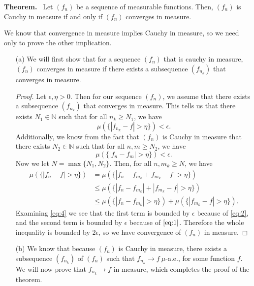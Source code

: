 \documentclass[12pt]{article}
\newcommand{\N}{\mathbb{N}}
\newcommand{\qeq}[1]{\begin{equation}#1\end{equation}}
\newcommand{\qal}[1]{\begin{align}#1\end{align}}
\begin{document}
\textbf{Theorem.}~ Let $(f_n)$ be a sequence of measurable functions. Then, $(f_n)$ is Cauchy in measure if and only if $(f_n)$ converges in measure.

We know that convergence in measure implies Cauchy in measure, so we need only to prove the other implication.
\begin{itemize}
    \item [(a)] We will first show that for a sequence $(f_n)$ that is cauchy in measure, $(f_n)$ converges in measure if there exists a subsequence $(f_{n_k})$ that converges in measure.
    
    \begin{proof}
        Let $\epsilon, \eta > 0$. Then for our sequence $(f_n)$, we assume that there exists a subsequence $(f_{n_k})$ that converges in measure. This tells us that there exists $N_1 \in \N$ such that for all $n_k \geq N_1$, we have
        \qeq{\mu(\{|f_{n_k} - f| > \eta\}) < \epsilon. \label{eq:1}}
        Additionally, we know from the fact that $(f_n)$ is Cauchy in measure that there exists $N_2 \in \N$ such that for all $n, m \geq N_2$, we have
        \qeq{\mu(\{|f_n - f_m| > \eta\}) < \epsilon. \label{eq:2}}
        Now we let $N = \max\{N_1, N_2\}$. Then, for all $n, m _k\geq N$, we have
        \qal{\mu(\{|f_n - f| > \eta\}) &= \mu(\{|f_n - f_{m_k} + f_{m_k} - f| > \eta\}) \nonumber \\
        &\leq \mu(\{|f_n - f_{m_k}| + |f_{m_k} - f| > \eta\}) \nonumber \\
        &\leq \mu(\{|f_n - f_{m_k}| > \eta\}) + \mu(\{|f_{m_k} - f| > \eta\}). \label{eq:4}}
        Examining \eqref{eq:4} we see that the first term is bounded by $\epsilon$ because of \eqref{eq:2}, and the second term is bounded by $\epsilon$ because of $\eqref{eq:1}$. Therefore the whole inequality is bounded by $2 \epsilon$, so we have convergence of $(f_n)$ in measure.
    \end{proof}

    \item [(b)] We know that because $(f_n)$ is Cauchy in measure, there exists a subsequence $(f_{n_k})$ of $(f_n)$ such that $f_{n_k} \to f ~\mu$-a.e., for some function $f$. We will now prove that $f_{n_k} \to f$ in measure, which completes the proof of the theorem.
    

\end{itemize}
\end{document}
